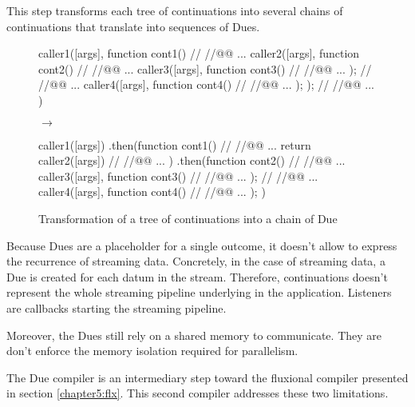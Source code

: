 This step transforms each tree of continuations into several chains of continuations that translate into sequences of Dues.

\begin{figure}[h!]
  \begin{minipage}{0.42\textwidth}
    \centering
    \begin{code}[js, caption={Nested calls of continuations},label={lst:nest-cint}]%
caller1([args], function cont1(){
  // //@@ ...
  caller2([args], function cont2(){
    // //@@ ...
    caller3([args], function cont3(){
      // //@@ ...
    });
    // //@@ ...
    caller4([args], function cont4(){
      // //@@ ...
    });
  });
  // //@@ ...
})\end{code}
  \end{minipage}
  \hfill
  $\to$
  \hfill
  \begin{minipage}{0.42\textwidth}
    \centering
    \begin{code}[js, caption={Chain of Due},label={lst:nest-cint}]%
caller1([args])
.then(function cont1(){
  // //@@ ...
  return caller2([args])
  // //@@ ...
})
.then(function cont2(){
  // //@@ ...
  caller3([args], function cont3(){
    // //@@ ...
  });
  // //@@ ...
  caller4([args], function cont4(){
    // //@@ ...
  });
})\end{code}
  \end{minipage}
  \label{fig:tree-to-chain}
  \caption{Transformation of a tree of continuations into a chain of Due}
\end{figure}


\separator


Because Dues are a placeholder for a single outcome, it doesn't allow to express the recurrence of streaming data.
Concretely, in the case of streaming data, a Due is created for each datum in the stream.
Therefore, continuations doesn't represent the whole streaming pipeline underlying in the application.
Listeners are callbacks starting the streaming pipeline.

Moreover, the Dues still rely on a shared memory to communicate.
They are don't enforce the memory isolation required for parallelism.

The Due compiler is an intermediary step toward the fluxional compiler presented in section \ref{chapter5:flx}.
This second compiler addresses these two limitations.
